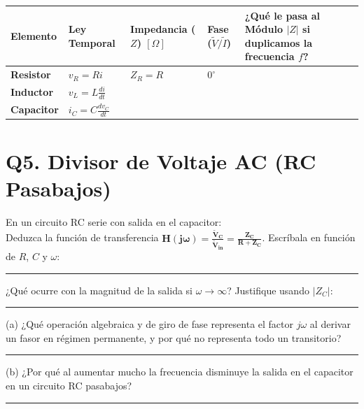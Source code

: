 \documentclass[11pt, a4paper]{article}
\begin{document}
\vspace{0.2cm}
\renewcommand{\arraystretch}{1.8}
\noindent
\begin{tabularx}{\textwidth}{
  >{\bfseries\RaggedRight\hsize=0.6\hsize}X 
  >{\centering\arraybackslash\hsize=0.8\hsize}X 
  >{\centering\arraybackslash\hsize=1.2\hsize}X 
  >{\centering\arraybackslash\hsize=0.8\hsize}X 
  >{\RaggedRight\arraybackslash\hsize=1.6\hsize}X}
\toprule
\textbf{Elemento} & \textbf{Ley Temporal} & \textbf{Impedancia ($Z$) $[\Omega]$} & \textbf{Fase ($\tilde{V}/\tilde{I}$)} & \textbf{¿Qué le pasa al Módulo $|Z|$ si duplicamos la frecuencia $f$?} \\
\midrule
Resistor & $v_R = Ri$ & $Z_R = R$ & $0^\circ$ & \\ \addlinespace
Inductor & $v_L = L \frac{di}{dt}$ & & & \\ \addlinespace
Capacitor & $i_C = C \frac{dv_C}{dt}$ & & & \\
\bottomrule
\end{tabularx}

\section*{Q5. Divisor de Voltaje AC (RC Pasabajos)}
En un circuito RC serie con salida en el capacitor: \\
Deduzca la función de transferencia $\mathbf{H(j\omega) = \frac{\tilde{V}_{\text{C}}}{\tilde{V}_{\text{in}}} = \frac{Z_C}{R + Z_C}}$. Escríbala en función de $R$, $C$ y $\omega$: \par\vspace{0.2cm}
\noindent\rule{\textwidth}{0.4pt} \par\vspace{0.2cm}
¿Qué ocurre con la magnitud de la salida si $\omega \to \infty$? Justifique usando $|Z_C|$: \par\vspace{0.2cm}
\noindent\rule{\textwidth}{0.4pt}

\vspace{0.4cm}
\begin{tcolorbox}[colback=red!5!white, colframe=red!70!black, title=\textbf{Exit Ticket (Individual)}]
\small
(a) ¿Qué operación algebraica y de giro de fase representa el factor $j\omega$ al derivar un fasor en régimen permanente, y por qué no representa todo un transitorio? \rule{3.5cm}{0.4pt} \par
\vspace{0.2cm}
(b) ¿Por qué al aumentar mucho la frecuencia disminuye la salida en el capacitor en un circuito RC pasabajos? \rule{3cm}{0.4pt} \par\vspace{0.2cm}
\noindent\hrulefill
\end{tcolorbox}
\end{document}
